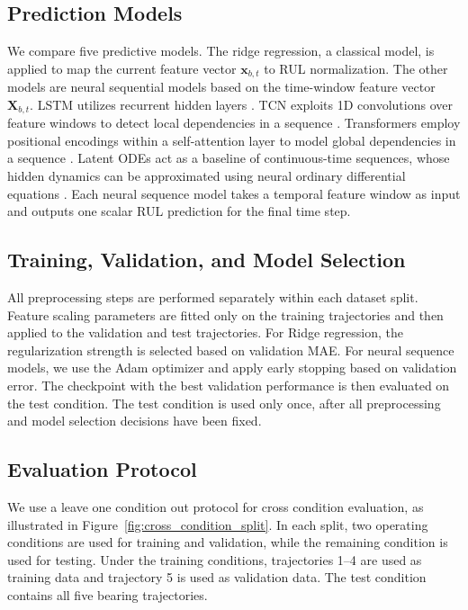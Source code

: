 \documentclass{article}
\begin{document}
\subsection{Prediction Models}

We compare five predictive models.
The ridge regression, a classical model, is applied to map the current feature vector $\mathbf{x}_{b,t}$ to RUL normalization.
The other models are neural sequential models based on the time-window feature vector $\mathbf{X}_{b,t}$.
LSTM utilizes recurrent hidden layers \citep{graves2012long}.
TCN exploits 1D convolutions over feature windows to detect local dependencies in a sequence \citep{bai2018empirical}.
Transformers employ positional encodings within a self-attention layer to model global dependencies in a sequence \citep{vaswani2017attention}.
Latent ODEs act as a baseline of continuous-time sequences, whose hidden dynamics can be approximated using neural ordinary differential equations \citep{chen2018neural}.
Each neural sequence model takes a temporal feature window as input and outputs one scalar RUL prediction for the final time step.

\subsection{Training, Validation, and Model Selection}

All preprocessing steps are performed separately within each dataset split. Feature scaling parameters are fitted only on the training trajectories and then applied to the validation and test trajectories. For Ridge regression, the regularization strength is selected based on validation MAE. For neural sequence models, we use the Adam optimizer and apply early stopping based on validation error. The checkpoint with the best validation performance is then evaluated on the test condition. The test condition is used only once, after all preprocessing and model selection decisions have been fixed.

\subsection{Evaluation Protocol}
\label{sec:evaluation_protocol}
We use a leave one condition out protocol for cross condition evaluation, as illustrated in Figure~\ref{fig:cross_condition_split}.
In each split, two operating conditions are used for training and validation, while the remaining condition is used for testing.
Under the training conditions, trajectories 1--4 are used as training data and trajectory 5 is used as validation data.
The test condition contains all five bearing trajectories.
\end{document}
